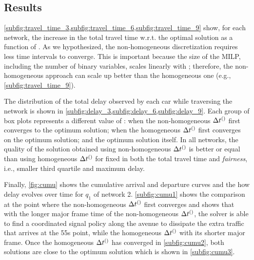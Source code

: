 \subsection{Results}

%
\cref{subfig:travel_time_3,subfig:travel_time_6,subfig:travel_time_9} show, for
each network, the increase in the total travel time w.r.t. the optimal solution
as a function of \Nn.
%
As we hypothesized, the non-homogeneous discretization requires less time
intervals to converge.
%
This is important because the size of the MILP, including the number of binary
variables, scales linearly with \Nn; therefore, the non-homogeneous approach can
scale up better than the homogeneous one (e.g., \cref{subfig:travel_time_9}).


The distribution of the total delay observed by each car while traversing the
network is shown in \cref{subfig:delay_3,subfig:delay_6,subfig:delay_9}.
%
Each group of box plots represents a different value of \Nn: when the
non-homogeneous $\DT[]$ first converges to the optimum solution; when the
homogeneous $\DT[]$ first converges on the optimum solution; and the optimum
solution itself.
%
In all networks, the quality of the solution obtained using non-homogeneous
$\DT[]$ is better or equal than using homogeneous $\DT[]$ for fixed \Nn in both
the total travel time and \emph{fairness}, i.e., smaller third quartile and
maximum delay.



Finally, \cref{fig:cumu} shows the cumulative arrival and departure curves and
the how delay evolves over time for $q_1$ of network 2.  \cref{subfig:cumu1}
shows the comparison at the point where the non-homogeneous $\DT[]$ first
converges and shows that with the longer major frame time of the non-homogeneous
$\DT[]$, the solver is able to find a coordinated signal policy along the avenue
to dissipate the extra traffic that arrives at the 55s point, while the
homogeneous $\DT[]$ with its shorter major frame. Once the homogeneous $\DT[]$
has converged in \cref{subfig:cumu2}, both solutions are close to the optimum
solution which is shown in \cref{subfig:cumu3}.


